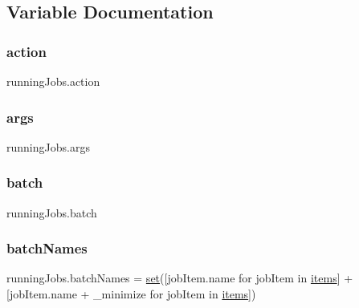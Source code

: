 \subsection{Variable Documentation}
\mbox{\label{namespacerunningJobs_adb058c43d244d0c62dbb4644d85609f1}} 
\subsubsection{\texorpdfstring{action}{action}}
{\footnotesize\ttfamily running\+Jobs.\+action}

\mbox{\label{namespacerunningJobs_a498f2bd71b059a02b3791d5460fed76c}} 
\subsubsection{\texorpdfstring{args}{args}}
{\footnotesize\ttfamily running\+Jobs.\+args}

\mbox{\label{namespacerunningJobs_a41e81dd05c6ed4532bee5f6630160945}} 
\subsubsection{\texorpdfstring{batch}{batch}}
{\footnotesize\ttfamily running\+Jobs.\+batch}

\mbox{\label{namespacerunningJobs_a1558158965c9e843da4e4a60ed52a80e}} 
\subsubsection{\texorpdfstring{batch\+Names}{batchNames}}
{\footnotesize\ttfamily running\+Jobs.\+batch\+Names = \mbox{\hyperlink{plotTT_8m_ae2445b699d1845d6abd1418ca39394c0}{set}}(\mbox{[}job\+Item.\+name for job\+Item in \mbox{\hyperlink{namespacerunningJobs_ac0608775f65edaa0cff43929a4c7940c}{items}}\mbox{]} + \mbox{[}job\+Item.\+name + \textquotesingle{}\+\_\+minimize\textquotesingle{} for job\+Item in \mbox{\hyperlink{namespacerunningJobs_ac0608775f65edaa0cff43929a4c7940c}{items}}\mbox{]})}

